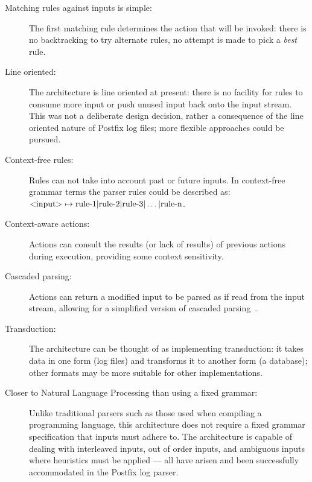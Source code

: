 \documentclass{svmult}
\begin{document}
\begin{description}

    \item [Matching rules against inputs is simple:]  The first matching
        rule determines the action that will be invoked: there is no
        backtracking to try alternate rules, no attempt is made to pick a
        \textit{best\/} rule.

    \item [Line oriented:]  The architecture is line oriented at present:
        there is no facility for rules to consume more input or push unused
        input back onto the input stream.  This was not a deliberate design
        decision, rather a consequence of the line oriented nature of
        Postfix log files; more flexible approaches could be pursued.

    \item [Context-free rules:]  Rules can not take into account past or
        future inputs.  In context-free grammar terms the parser rules
        could be described as:
        \newline{}$\text{\textless{}input\textgreater{}} \mapsto
        \text{rule-1} | \text{rule-2} | \text{rule-3} | \dots |
        \text{rule-n}$.

    \item [Context-aware actions:] Actions can consult the results (or lack
        of results) of previous actions during execution, providing some
        context sensitivity.  
        
    \item [Cascaded parsing:] Actions can return a modified input to be
        parsed as if read from the input stream, allowing for a simplified
        version of cascaded parsing~\cite{cascaded-parsing}.

    \item [Transduction:]  The architecture can be thought of as
        implementing transduction: it takes data in one form (log files)
        and transforms it to another form (a database); other formats may
        be more suitable for other implementations.

    \item [Closer to Natural Language Processing than using a fixed
        grammar:] Unlike traditional parsers such as those used when
        compiling a programming language, this architecture does not
        require a fixed grammar specification that inputs must adhere to.
        The architecture is capable of dealing with interleaved inputs, out
        of order inputs, and ambiguous inputs where heuristics must be
        applied --- all have arisen and been successfully accommodated in
        the Postfix log parser.

\end{description}
\end{document}

